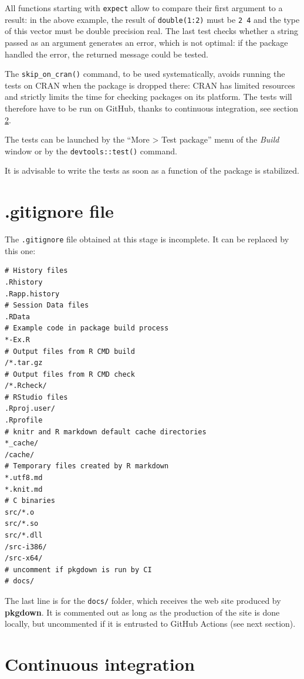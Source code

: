 \documentclass[
  12pt,
  american,
  a4paper,
  extrafontsizes,onecolumn,openright
  ]{memoir}
\begin{document}
\normalsize

All functions starting with \texttt{expect} allow to compare their first argument to a result: in the above example, the result of \texttt{double(1:2)} must be \texttt{2\ 4} and the type of this vector must be double precision real.
The last test checks whether a string passed as an argument generates an error, which is not optimal: if the package handled the error, the returned message could be tested.

The \texttt{skip\_on\_cran()} command, to be used systematically, avoids running the tests on CRAN when the package is dropped there: CRAN has limited resources and strictly limits the time for checking packages on its platform.
The tests will therefore have to be run on GitHub, thanks to continuous integration, see section \ref{sec:package-ci5}.

The tests can be launched by the \enquote{More \textgreater{} Test package} menu of the \emph{Build} window or by the \texttt{devtools::test()} command.

It is advisable to write the tests as soon as a function of the package is stabilized.

\hypertarget{gitignore-file}{%
\section{.gitignore file}\label{gitignore-file}}

The \texttt{.gitignore} file obtained at this stage is incomplete.
It can be replaced by this one:

\begin{verbatim}
# History files
.Rhistory
.Rapp.history
# Session Data files
.RData
# Example code in package build process
*-Ex.R
# Output files from R CMD build
/*.tar.gz
# Output files from R CMD check
/*.Rcheck/
# RStudio files
.Rproj.user/
.Rprofile
# knitr and R markdown default cache directories
*_cache/
/cache/
# Temporary files created by R markdown
*.utf8.md
*.knit.md
# C binaries
src/*.o
src/*.so
src/*.dll
/src-i386/
/src-x64/
# uncomment if pkgdown is run by CI
# docs/
\end{verbatim}

The last line is for the \texttt{docs/} folder, which receives the web site produced by \textbf{pkgdown}.
It is commented out as long as the production of the site is done locally, but uncommented if it is entrusted to GitHub Actions (see next section).

\hypertarget{sec:package-ci5}{%
\section{Continuous integration}\label{sec:package-ci5}}
\end{document}
